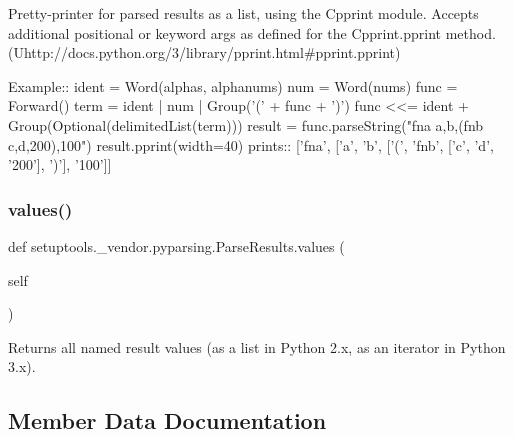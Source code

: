 \begin{DoxyVerb}Pretty-printer for parsed results as a list, using the C{pprint} module.
Accepts additional positional or keyword args as defined for the 
C{pprint.pprint} method. (U{http://docs.python.org/3/library/pprint.html#pprint.pprint})

Example::
    ident = Word(alphas, alphanums)
    num = Word(nums)
    func = Forward()
    term = ident | num | Group('(' + func + ')')
    func <<= ident + Group(Optional(delimitedList(term)))
    result = func.parseString("fna a,b,(fnb c,d,200),100")
    result.pprint(width=40)
prints::
    ['fna',
     ['a',
      'b',
      ['(', 'fnb', ['c', 'd', '200'], ')'],
      '100']]
\end{DoxyVerb}
 \mbox{\label{classsetuptools_1_1__vendor_1_1pyparsing_1_1ParseResults_afdbaeb8462d5a1d91956b9e25adcff0b}} 
\subsubsection{\texorpdfstring{values()}{values()}}
{\footnotesize\ttfamily def setuptools.\+\_\+vendor.\+pyparsing.\+Parse\+Results.\+values (\begin{DoxyParamCaption}\item[{}]{self }\end{DoxyParamCaption})}

\begin{DoxyVerb}Returns all named result values (as a list in Python 2.x, as an iterator in Python 3.x).\end{DoxyVerb}
 

\subsection{Member Data Documentation}
\mbox{\label{classsetuptools_1_1__vendor_1_1pyparsing_1_1ParseResults_afd21e25c5292f241010671485002981e}} 
